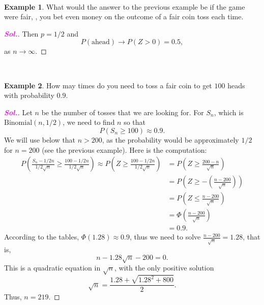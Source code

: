 \documentclass[12pt,a4paper]{article}
\theoremstyle{definition}
\newtheorem{example}{Example}[section]
\theoremstyle{definition}
\theoremstyle{definition}
\theoremstyle{definition}
\theoremstyle{remark}
\theoremstyle{definition}
\newcommand{\dispsty}{\displaystyle}
\newcommand{\sol}{\textcolor{magenta}{\bf \textit{Sol.}}\quad}
\newcommand{\ie}{\text{i.e.}}
\begin{document}
\
\begin{example}
	What would the answer to the previous example be if the game were fair, \ie, you bet even money on the outcome of a fair coin toss each time.\begin{proof}[\sol]
		Then $p=1/2$ and \[
		P(\text{ahead})\to P(Z>0)=0.5,
		\] as $n\to\infty$.
	\end{proof}
\end{example}
\
\begin{example}
	How may times do you need to toss a fair coin to get $100$ heads with probability $0.9$.\begin{proof}[\sol]
		Let $n$ be the number of tosses that we are looking for. For $S_n$, which is $\text{Binomial}(n,1/2)$, we need to find $n$ so that \[
		P(S_n\geq 100)\approx0.9.
		\] We will use below that $n>200$, as the probability would be approximately $1/2$ for $n=200$ (see the previous example). Here is the computation: \begin{align*}
		P\left(\frac{S_n-1/2n}{1/2\sqrt{n}}\geq\frac{100-1/2n}{1/2\sqrt{n}}\right)\approx P\left(Z\geq\frac{100-1/2n}{1/2\sqrt{n}}\right)&=P\left(Z\geq\frac{200-n}{\sqrt{n}}\right)\\
		&=P\left(Z\geq-\left(\frac{n-200}{\sqrt{n}}\right)\right)\\
		&=P\left(Z\leq\frac{n-200}{\sqrt{n}}\right)\\
		&=\Phi\left(\frac{n-200}{\sqrt{n}}\right)\\
		&=0.9.
		\end{align*} According to the tables, $\Phi(1.28)\approx0.9$, thus we need to solve $\dispsty\frac{n-200}{\sqrt{n}}=1.28$, that is, \[
		n-1.28\sqrt{n}-200=0.
		\] This is a quadratic equation in $\sqrt{n}$, with the only positive solution \[
		\sqrt{n}=\frac{1.28+\sqrt{1.28^2+800}}{2}.
		\] Thus, $n=219$.
	\end{proof}
\end{example}
\newpage
\end{document}
